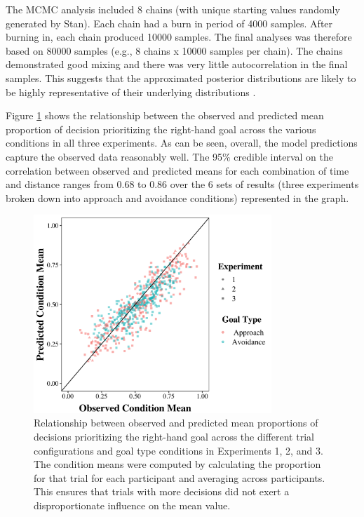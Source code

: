 \documentclass[a4paper,doc,natbib,donotrepeattitle]{apa6}
\begin{document}
The MCMC analysis included 8 chains (with unique starting values randomly generated by Stan). Each chain had a burn in period of 4000 samples. After burning in, each chain produced 10000 samples. The final analyses was therefore based on 80000 samples (e.g., 8 chains x 10000 samples per chain). The chains demonstrated good mixing and there was very little autocorrelation in the final samples. This  suggests that the approximated posterior distributions are likely to be highly representative of their underlying distributions \citep{Kruschke2012}.

Figure \ref{fig:predictives_scatter} shows the relationship between the observed and predicted mean proportion of decision prioritizing the right-hand goal across the various conditions in all three experiments. As can be seen, overall, the model predictions capture the observed data reasonably well. The 95\% credible interval on the correlation between observed and predicted means for each combination of time and distance ranges from 0.68 to 0.86 over the 6 sets of results (three experiments broken down into approach and avoidance conditions) represented in the graph.

\begin{figure}[h!]
\centering
\includegraphics[width=0.8\textwidth]{predictives_scatterplot.png}
\caption{\label{fig:predictives_scatter} Relationship between observed and predicted mean proportions of decisions prioritizing the right-hand goal across the different trial configurations and goal type conditions in Experiments 1, 2, and 3. The condition means were computed by calculating the proportion for that trial for each participant and averaging across participants. This ensures that trials with more decisions did not exert a disproportionate influence on the mean value. }
\end{figure}
\end{document}
